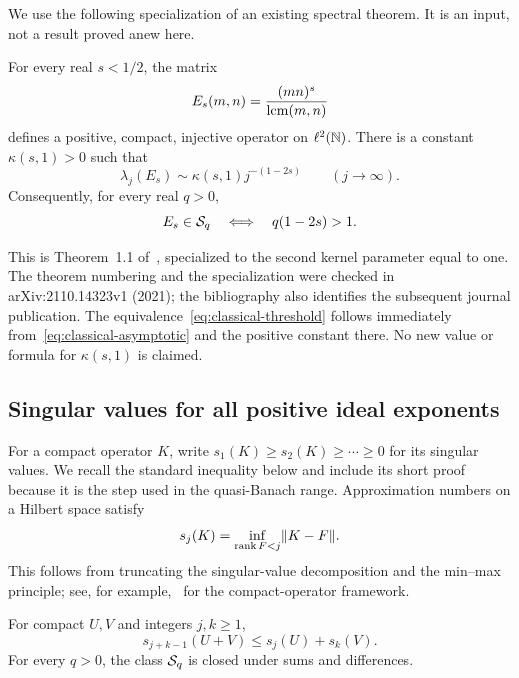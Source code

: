 We use the following specialization of an existing spectral theorem.
It is an input, not a result proved anew here.

\begin{theorem}
\label{thm:classical}
For every real $s<1/2$, the matrix
\begin{equation}
 E_s(m,n)=\frac{(mn)^s}{\operatorname{lcm}(m,n)}
 \label{eq:shifted-kernel}
\end{equation}
defines a positive, compact, injective operator on $\ell^2(\mathbb N)$. There is
a constant $\kappa(s,1)>0$ such that
\begin{equation}
 \lambda_j(E_s)\sim\kappa(s,1)j^{-(1-2s)}
 \qquad(j\to\infty).
 \label{eq:classical-asymptotic}
\end{equation}
Consequently, for every real $q>0$,
\begin{equation}
 E_s\in\mathcal S_q\quad\Longleftrightarrow\quad q(1-2s)>1.
 \label{eq:classical-threshold}
\end{equation}
\end{theorem}

This is Theorem~1.1 of~\cite{HilberdinkPushnitski2023}, specialized
to the second kernel parameter equal to one. The theorem numbering and
the specialization were checked in arXiv:2110.14323v1 (2021); the
bibliography also identifies the subsequent journal publication.
The equivalence~\eqref{eq:classical-threshold} follows immediately
from~\eqref{eq:classical-asymptotic} and the positive constant there.
No new value or formula for $\kappa(s,1)$ is claimed.

\subsection{Singular values for all positive ideal exponents}

For a compact operator $K$, write $s_1(K)\ge s_2(K)\ge\cdots\ge0$
for its singular values. We recall the standard inequality below and
include its short proof because it is the step used in the
quasi-Banach range. Approximation numbers on a Hilbert space satisfy
\begin{equation}
 s_j(K)=\inf_{\operatorname{rank} F<j}\lVert K-F\rVert.
 \label{eq:approximation}
\end{equation}
This follows from truncating the singular-value decomposition and the
min--max principle; see, for example,~\cite{Simon2005} for the
compact-operator framework.

\begin{lemma}
\label{lem:sv-sum}
For compact $U,V$ and integers $j,k\ge1$,
\begin{equation}
 s_{j+k-1}(U+V)\le s_j(U)+s_k(V).
 \label{eq:sv-sum}
\end{equation}
For every $q>0$, the class $\mathcal S_q$ is closed under sums and differences.
\end{lemma}


